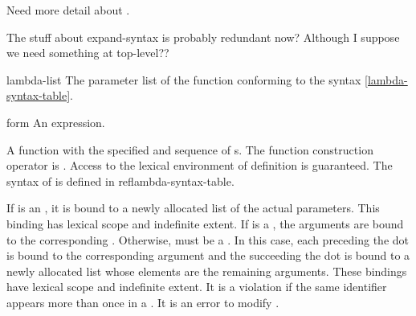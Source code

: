 \label{function}
%
\begin{optPrivate}
    Need more detail about .

    The stuff about expand-syntax is probably redundant now?  Although I
    suppose we need something at top-level??
\end{optPrivate}
%
\begin{optDefinition}
%
%
\Syntax
\label{lambda-syntax-table}
%
%
\begin{arguments}
    \item[lambda-list] The parameter list of the function conforming to the
    syntax \ref{lambda-syntax-table}.
    \item[form] An expression.
\end{arguments}
%
\result%
A function with the specified  and sequence of s.
%
\remarks%
The function construction operator is .  Access to the lexical
environment of definition is guaranteed.  The syntax of  is
defined in ref{lambda-syntax-table}.

If  is an , it is bound to a newly
allocated list of the actual parameters.  This binding  has lexical scope and indefinite
extent.  If  is a , the arguments are
bound to the corresponding .  Otherwise, 
must be a .  In this case, each  preceding
the dot is bound to the corresponding argument and the 
succeeding the dot is bound to a newly allocated list whose elements are the
remaining arguments.  These bindings have lexical scope and indefinite extent.
It is a violation if the same identifier appears more than once in a
.  It is an error to modify .


\end{optDefinition}
